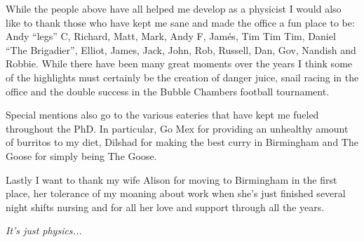 While the people above have all helped me develop as a physicist I would also like to thank those who have kept me sane and made the office a fun place to be: Andy ``legs'' C, Richard, Matt, Mark, Andy F, Jam\'{e}s, Tim Tim Tim, Daniel ``The Brigadier'', Elliot, James, Jack, John, Rob, Russell, Dan, Gov, Nandish and Robbie. While there have been many great moments over the years I think some of the highlights must certainly be the creation of danger juice, snail racing in the office and the double success in the Bubble Chambers football tournament. 

Special mentions also go to the various eateries that have kept me fueled throughout the PhD. In particular, Go Mex for providing an unhealthy amount of burritos to my diet, Dilshad for making the best curry in Birmingham and The Goose for simply being The Goose.

Lastly I want to thank my wife Alison for moving to Birmingham in the first place, her tolerance of my moaning about work when she's just finished several night shifts nursing and for all her love and support through all the years. 
%
\cleardoublepage
~
\vspace*{\fill}
\begin{center}
  \emph{It's just physics...}
\end{center}
\vspace*{\fill}
\cleardoublepage
